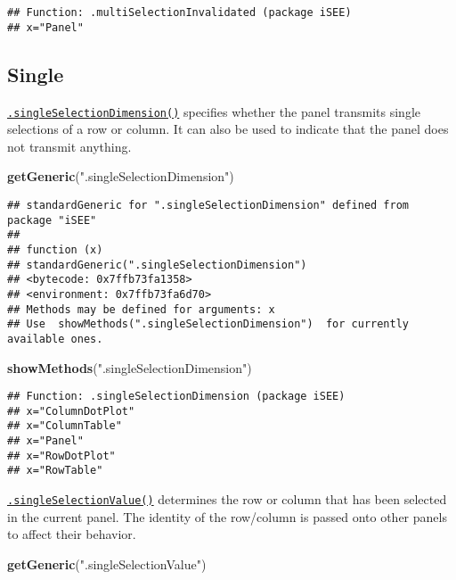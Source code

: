 \documentclass[
]{book}
\newenvironment{Shaded}{\begin{snugshade}}{\end{snugshade}}
\newcommand{\KeywordTok}[1]{\textcolor[rgb]{0.13,0.29,0.53}{\textbf{#1}}}
\newcommand{\NormalTok}[1]{#1}
\newcommand{\StringTok}[1]{\textcolor[rgb]{0.31,0.60,0.02}{#1}}
\begin{document}
\begin{verbatim}
## Function: .multiSelectionInvalidated (package iSEE)
## x="Panel"
\end{verbatim}

\hypertarget{single}{%
\subsection{Single}\label{single}}

\href{https://isee.github.io/iSEE/reference/single-select-generics.html}{\texttt{.singleSelectionDimension()}} specifies whether the panel transmits single selections of a row or column.
It can also be used to indicate that the panel does not transmit anything.

\begin{Shaded}
\begin{Highlighting}[]
\KeywordTok{getGeneric}\NormalTok{(}\StringTok{".singleSelectionDimension"}\NormalTok{)}
\end{Highlighting}
\end{Shaded}

\begin{verbatim}
## standardGeneric for ".singleSelectionDimension" defined from package "iSEE"
## 
## function (x) 
## standardGeneric(".singleSelectionDimension")
## <bytecode: 0x7ffb73fa1358>
## <environment: 0x7ffb73fa6d70>
## Methods may be defined for arguments: x
## Use  showMethods(".singleSelectionDimension")  for currently available ones.
\end{verbatim}

\begin{Shaded}
\begin{Highlighting}[]
\KeywordTok{showMethods}\NormalTok{(}\StringTok{".singleSelectionDimension"}\NormalTok{)}
\end{Highlighting}
\end{Shaded}

\begin{verbatim}
## Function: .singleSelectionDimension (package iSEE)
## x="ColumnDotPlot"
## x="ColumnTable"
## x="Panel"
## x="RowDotPlot"
## x="RowTable"
\end{verbatim}

\href{https://isee.github.io/iSEE/reference/single-select-generics.html}{\texttt{.singleSelectionValue()}} determines the row or column that has been selected in the current panel.
The identity of the row/column is passed onto other panels to affect their behavior.

\begin{Shaded}
\begin{Highlighting}[]
\KeywordTok{getGeneric}\NormalTok{(}\StringTok{".singleSelectionValue"}\NormalTok{)}
\end{Highlighting}
\end{Shaded}
\end{document}
